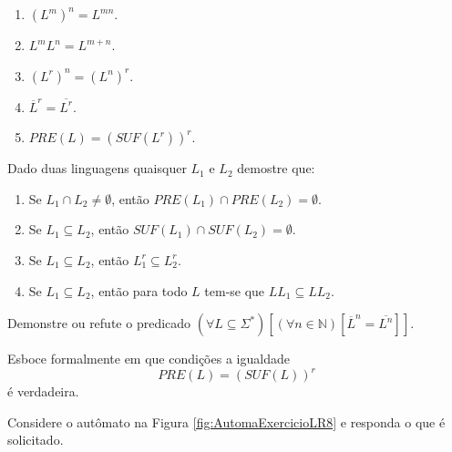 \begin{enumerate}
	\item $(L^m)^n = L^{mn}$.
	\item $L^mL^n = L^{m+n}$.
	\item $(L^r)^n = (L^n)^r$.
	\item $\overline{L}^r = \overline{L^r}$.
	\item $PRE(L) = (SUF(L^r))^r$.
\end{enumerate}

\begin{exercise}\label{exerc:LR5}
	Dado duas linguagens quaisquer $L_1$ e $L_2$ demostre que:
\end{exercise}

\begin{enumerate}
	\item Se $L_1 \cap L_2 \neq \emptyset$, então $PRE(L_1) \cap PRE(L_2) = \emptyset$.
	\item Se $L_1 \subseteq L_2$, então $SUF(L_1) \cap SUF(L_2) = \emptyset$.
	\item Se $L_1 \subseteq L_2$, então $L_1^r \subseteq L_2^r$.
	\item Se $L_1 \subseteq L_2$, então para todo $L$ tem-se que $LL_1 \subseteq LL_2$. 
\end{enumerate}

\begin{exercise}\label{exerc:LR6}
	Demonstre ou refute o predicado $(\forall L \subseteq \Sigma^*)[(\forall n \in \mathbb{N})[\overline{L}^n = \overline{L^n}]]$.
\end{exercise}

\begin{exercise}\label{exerc:LR7}
	Esboce formalmente em que condições a igualdade 
	$$PRE(L) = (SUF(L))^r$$ 
	é verdadeira.
\end{exercise}

\begin{exercise}\label{exerc:LR8}
	Considere o autômato na Figura \ref{fig:AutomaExercicioLR8} e responda o que é solicitado.
\end{exercise}

